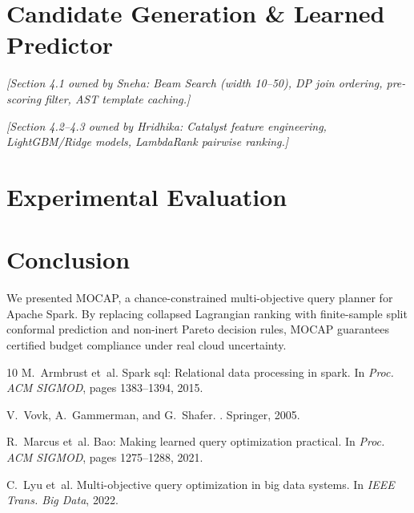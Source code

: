 \documentclass[journal,10pt,onecolumn]{article}
\begin{document}
\section{Candidate Generation \& Learned Predictor}
\label{sec:system_design}

\textit{[Section 4.1 owned by Sneha: Beam Search (width 10--50), DP join ordering, pre-scoring filter, AST template caching.]}

\textit{[Section 4.2--4.3 owned by Hridhika: Catalyst feature engineering, LightGBM/Ridge models, LambdaRank pairwise ranking.]}

\section{Experimental Evaluation}
\label{sec:experiments}



\section{Conclusion}
\label{sec:conclusion}
We presented MOCAP, a chance-constrained multi-objective query planner for Apache Spark. By replacing collapsed Lagrangian ranking with finite-sample split conformal prediction and non-inert Pareto decision rules, MOCAP guarantees certified budget compliance under real cloud uncertainty.


\begin{thebibliography}{10}
M.~Armbrust et~al.
\newblock Spark sql: Relational data processing in spark.
\newblock In {\em Proc. ACM SIGMOD}, pages 1383--1394, 2015.

V.~Vovk, A.~Gammerman, and G.~Shafer.
.
\newblock Springer, 2005.

R.~Marcus et~al.
\newblock Bao: Making learned query optimization practical.
\newblock In {\em Proc. ACM SIGMOD}, pages 1275--1288, 2021.

C.~Lyu et~al.
\newblock Multi-objective query optimization in big data systems.
\newblock In {\em IEEE Trans. Big Data}, 2022.
\end{thebibliography}
\end{document}
